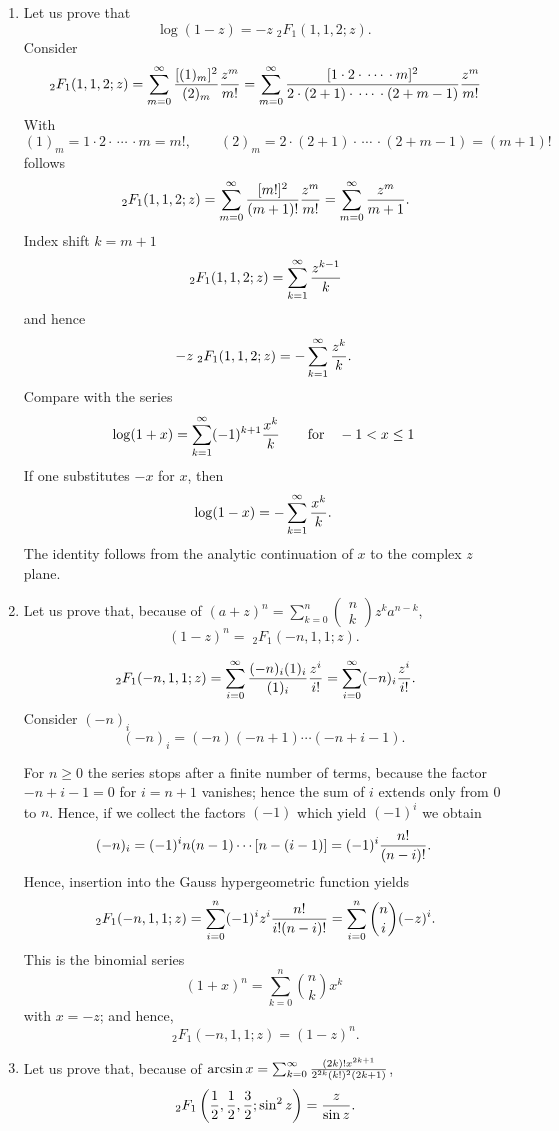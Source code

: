 {
\color{blue}
\bexample

\begin{enumerate}

\item
Let us prove that
 $$\log (1-z)=-z {\;}_2F_1(1,1,2;z) . $$
Consider
$$
   {\;}_2F_1(1,1,2;z)=\sum_{m=0}^\infty{[(1)_m]^2\over(2)_m}{z^m\over m!}=
   \sum_{m=0}^\infty{[1\cdot2\cdot\,\cdots\,\cdot m]^2\over
   2\cdot(2+1)\cdot\,\cdots\,\cdot(2+m-1)}{z^m\over m!}
$$
With
$$
   (1)_m=1\cdot2\cdot\,\cdots\,\cdot m=m!,\qquad
   (2)_m=2\cdot(2+1)\cdot\,\cdots\,\cdot (2+m-1)=(m+1)!
$$
follows
$$
   {\;}_2F_1(1,1,2;z)=\sum_{m=0}^\infty{[m!]^2\over(m+1)!}
   {z^m\over m!}=\sum_{m=0}^\infty {z^m\over m+1}.
$$
Index shift $k =m+1$
$$
   {\;}_2F_1(1,1,2;z)=\sum_{k=1}^\infty {z^{k-1}\over k}
$$
and hence
$$
   -z{\;}_2F_1(1,1,2;z)=-\sum_{k=1}^\infty{z^k\over k}.
$$
Compare with the series
$$
   \log(1+x)=\sum_{k=1}^\infty(-1)^{k+1}{x^k\over k}\qquad
   \mbox{for}\quad -1<x\leq1
$$
If one substitutes $-x$ for $x$, then
$$
   \log(1-x)=-\sum_{k=1}^\infty{x^k\over k}.
$$
The identity follows from the analytic continuation of $x$ to the complex $z$ plane.


\item
Let us prove that,  because of
$
(a+z)^n
=
\sum_{k=0}^n
\begin{pmatrix}
n\\
k
\end{pmatrix}
 z^ka^{n-k}$,
 $$(1-z)^n={\;}_2F_1(-n,1,1;z). $$

$$
   {\;}_2F_1(-n,1,1;z)=\sum_{i=0}^\infty{(-n)_i(1)_i\over(1)_i}{z^i\over i!}=
   \sum_{i=0}^\infty(-n)_i{z^i\over i!}.
$$
Consider $(-n)_i$
$$
   (-n)_i=(-n)(-n+1)\cdots(-n+i-1).
$$

For  $n\geq 0$
the series stops after a finite number of terms, because the factor
$-n+i-1=0$ for $i=n+1$ vanishes;
hence the sum of $i$ extends only
from $0$ to $n$.
Hence, if we collect the factors
 $(-1)$ which yield $(-1)^i$ we obtain
$$
   (-n)_i=(-1)^in(n-1)\cdots[n-(i-1)]=(-1)^i{n!\over(n-i)!}.
$$
Hence, insertion into the Gauss hypergeometric function yields
$$
   {\;}_2F_1(-n,1,1;z)=\sum_{i=0}^n(-1)^iz^i{n!\over i!(n-i)!}=
   \sum_{i=0}^n{n\choose i}(-z)^i.
$$
This is the binomial series
$$
   (1+x)^n=\sum_{k=0}^n{n\choose k}x^k
$$
with $x=-z$; and hence,
$$
   {\;}_2F_1(-n,1,1;z)=(1-z)^n.
$$




\item
 Let us prove that,  because of $\arcsin x=\sum_{k=0}^\infty
 {(2k)!x^{2k+1}\over 2^{2k}(k!)^2(2k+1)}$,
 $${\;}_2F_1\left({1\over 2},{1\over 2},{3\over 2}; \sin^2 z\right)
 ={z\over \sin z }  .$$


\end{enumerate}}
